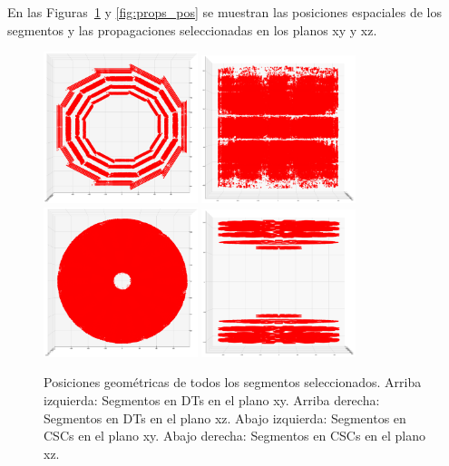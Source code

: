 En las Figuras~\ref{fig:segments_pos} y \ref{fig:props_pos} se muestran las posiciones espaciales de los segmentos y las propagaciones seleccionadas en los planos xy y xz. \\


\begin{figure}
\centering
\includegraphics[width=0.4\textwidth]{figures/Hits_DT_xy.png}
\includegraphics[width=0.4\textwidth]{figures/Hits_DT_xz.png}
\includegraphics[width=0.4\textwidth]{figures/Hits_CSC_xy.png}
\includegraphics[width=0.4\textwidth]{figures/Hits_CSC_xz.png}
\caption{Posiciones geom\'etricas de todos los segmentos seleccionados. Arriba izquierda: Segmentos en DTs en el plano xy. Arriba derecha: Segmentos en DTs en el plano xz. Abajo izquierda: Segmentos en CSCs en el plano xy. Abajo derecha: Segmentos en CSCs en el plano xz.}
\label{fig:segments_pos}
\end{figure}



